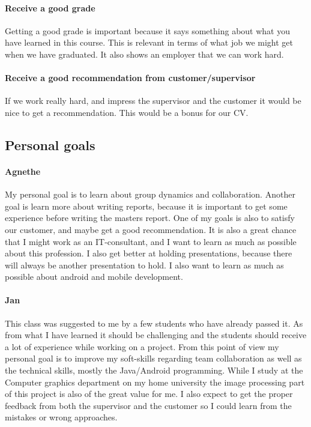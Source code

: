 \paragraph{Receive a good grade}
Getting a good grade is important because it says something about what you have learned in this course. 
This is relevant in terms of what job we might get when we have graduated. It also shows an employer that we can work hard. 
\paragraph{Receive a good recommendation from customer/supervisor}
If we work really hard, and impress the supervisor and the customer it would be nice to get a recommendation. This would be a bonus for our CV.


\subsection{Personal goals}
\paragraph{Agnethe}

My personal goal is to learn about group dynamics and collaboration. Another goal is learn more about writing reports, because it is important to get some experience before writing the masters report. One of my goals is also to  satisfy our customer, and maybe get a good recommendation. It is also a great chance that I might work as an IT-consultant, and I want to learn as much as possible about this profession. I also  get better at holding presentations, because there will always be another presentation to hold. I also want to learn as much as possible about android and mobile development.

\paragraph{Jan}

This class was suggested to me by a few students who have already passed it. As from what I have learned it should be challenging and the students should receive a lot of experience while working on a project. From this point of view my personal goal is to improve my soft-skills regarding team collaboration as well as the technical skills, mostly the Java/Android programming. While I study at the Computer graphics department on my home university the image processing part of this project is also of the great value for me. I also expect to get the proper feedback from both the supervisor and the customer so I could learn from the mistakes or wrong approaches.

